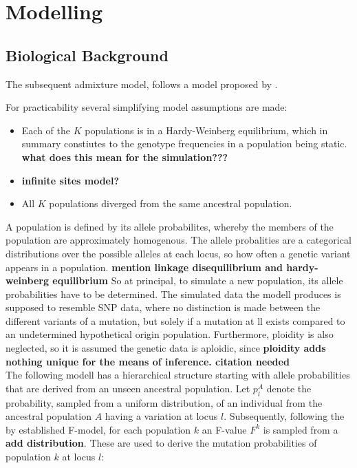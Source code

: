 \documentclass[a4paper, 11pt]{article}
\begin{document}
\section{Modelling}

\subsection{Biological Background}
The subsequent admixture model, follows a model proposed by \cite{pritchard2000inference}. 

For practicability several simplifying model assumptions are made:
\begin{itemize}
\item Each of the $K$ populations is in a Hardy-Weinberg equilibrium, which in summary constiutes to the genotype frequencies in a population being static. \textbf{what does this mean for the simulation???}
\item \textbf{infinite sites model?}
\item All $K$ populations diverged from the same ancestral population.
\end{itemize}

A population is defined by its allele probabilites, whereby the members of the population are approximately homogenous. The allele probalities are a categorical distributions over the possible alleles at each locus, so how often a genetic variant appears in a population. \textbf{mention linkage disequilibrium and hardy-weinberg equilibrium} So at principal, to simulate a new population, its allele probabilities have to be determined. The simulated data the modell produces is supposed to resemble SNP data, where no distinction is made between the different variants of a mutation, but solely if a mutation at ll exists compared to an undetermined hypothetical origin population. Furthermore, ploidity is also neglected, so it is assumed the genetic data is aploidic, since \textbf{ploidity adds nothing unique for the means of inference. citation needed} \\
The following modell has a hierarchical structure starting with allele probabilities that are derived from an unseen ancestral population. Let $p^{A}_{l}$ denote the probability, sampled from a uniform distribution, of an individual from the ancestral population $A$ having a variation at locus $l$. Subsequently, following the by \cite{falush2003inference} established F-model, for each population $k$ an F-value $F^{k}$ is sampled from a \textbf{add distribution}. These are used to derive the mutation probabilities of population $k$ at locus $l$:
\end{document}
